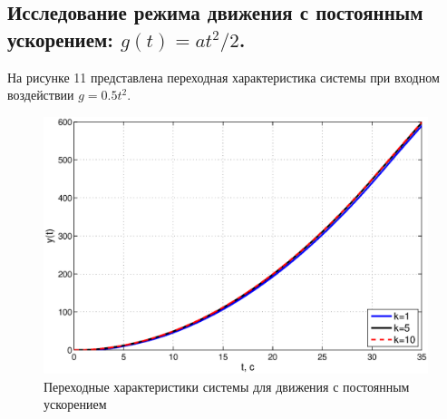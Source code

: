 \documentclass[12pt,a4paper]{article}
\begin{document}
\subsection{Исследование режима движения с постоянным ускорением: $g(t)=at^2/2$.} 
На рисунке 11 представлена переходная характеристика системы при входном воздействии $g=0.5t^2$.
\begin{figure}[H]
	\centering
	\includegraphics[width=0.95\linewidth]{2.3.eps}
	\caption{Переходные характеристики системы для движения с постоянным ускорением}
\end{figure}
\end{document}
